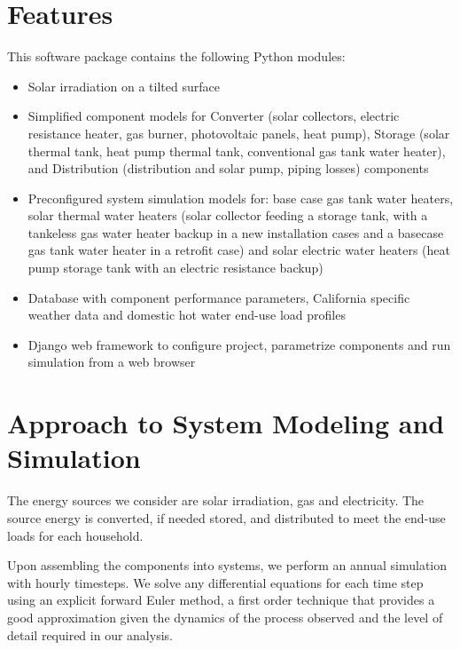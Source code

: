 \documentclass[letterpaper,10pt,english,openany]{sphinxmanual}
\begin{document}
\section{Features}
\label{\detokenize{source/models:features}}
This software package contains the following Python modules:
\begin{itemize}
\item {} 
Solar irradiation on a tilted surface

\item {} 
Simplified component models for Converter (solar collectors, electric resistance heater, gas burner, photovoltaic panels, heat pump), Storage (solar thermal tank, heat pump thermal tank, conventional gas tank water heater), and Distribution (distribution and solar pump, piping losses) components

\item {} 
Preconfigured system simulation models for: base case gas tank water heaters, solar thermal water heaters (solar collector feeding a storage tank, with a tankeless gas water heater backup in a new installation cases and a basecase gas tank water heater in a retrofit case) and solar electric water heaters (heat pump storage tank with an electric resistance backup)

\item {} 
Database with component performance parameters, California specific weather data and domestic hot water end-use load profiles

\item {} 
Django web framework to configure project, parametrize components and run simulation from a web browser

\end{itemize}


\section{Approach to System Modeling and Simulation}
\label{\detokenize{source/models:approach-to-system-modeling-and-simulation}}
The energy sources we consider are solar irradiation, gas and electricity. The source energy is converted, if needed stored, and distributed to meet the end-use loads for each household.

Upon assembling the components into systems, we perform an annual simulation with hourly timesteps. We solve any differential equations for each time step using an explicit forward Euler method, a first order technique that provides a good approximation given the dynamics of the process observed and the level of detail required in our analysis.
\end{document}
